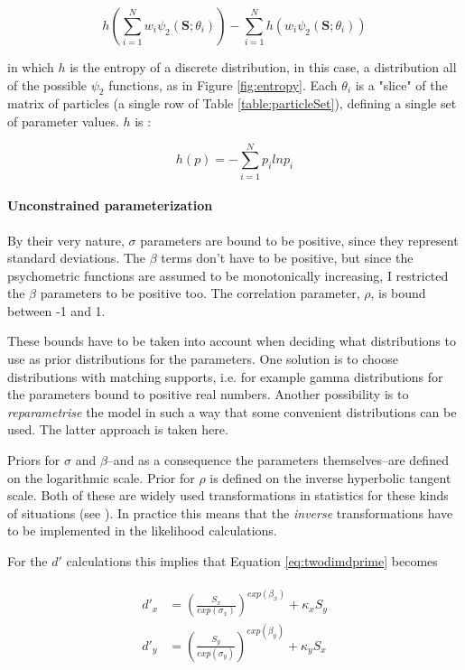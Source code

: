 \documentclass{article}\usepackage{knitr}
\begin{document}
\begin{equation}
h(\sum_{i=1}^N w_i \psi_2(\bm{S};\theta_i)) - \sum_{i=1}^N h(w_i \psi_2(\bm{S};\theta_i)) 
\end{equation}

in which $h$ is the entropy of a discrete distribution, in this case, a distribution all of the possible $\psi_2$ functions, as in Figure \ref{fig:entropy}. Each $\theta_i$ is a "slice" of the matrix of particles (a single  row of Table \ref{table:particleSet}), defining a single set of parameter values. $h$ is \citep{kontsevichtyler1999}:

\begin{equation}
h(p) = -\sum_{i = 1}^{N} p_i ln p_i
\end{equation}

\paragraph{Unconstrained parameterization}

By their very nature, $\sigma$ parameters are bound to be positive, since they represent standard deviations. The $\beta$ terms don't have to be positive, but since the psychometric functions are assumed to be monotonically increasing, I restricted the $\beta$ parameters to be positive too. The correlation parameter, $\rho$, is bound between -1 and 1. 

These bounds have to be taken into account when deciding what distributions to use as prior distributions for the parameters. One solution is to choose distributions with matching supports, i.e. for example gamma distributions for the parameters bound to positive real numbers. Another possibility is to \textit{reparametrise} the model in such a way that some convenient distributions can be used. The latter approach is taken here. 

Priors for $\sigma$ and $\beta$--and as a consequence the parameters themselves--are defined on the logarithmic scale. Prior for $\rho$ is defined on the inverse hyperbolic tangent scale. Both of these are widely used transformations in statistics for these kinds of situations (see \citet[Chapter 22]{stan_manual}). In practice this means  that the \textit{inverse} transformations have to be implemented in the likelihood calculations.

For the $d'$ calculations this implies that Equation \ref{eq:twodimdprime} becomes

\begin{align}
\begin{split}
d'_x &= (\frac{S_x}{exp(\sigma_x)})^{exp(\beta_x)} + \kappa_x S_y \\
d'_y &= (\frac{S_y}{exp(\sigma_y)})^{exp(\beta_y)} + \kappa_y S_x
\end{split}
\end{align}
\end{document}
